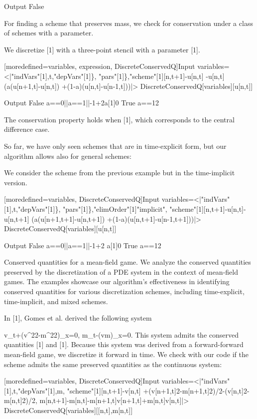 \documentclass{article}
\begin{document}
{		{Output}
  False

	

For finding a scheme that preserves mass, we check for conservation under a class of schemes with a parameter.

	We discretize [1] with a three-point stencil with a parameter [1].
	
	
		[moredefined={variables, expression, DiscreteConservedQ}]{Input}
  variables=<|"indVars"[1],t,"depVars"[1]\},
  "pars"[1]\},"scheme"[1][n,t+1]-u[n,t]
  -u[n,t](a(u[n+1,t]-u[n,t])
  +(1-a)(u[n,t]-u[n-1,t]))|>
  DiscreteConservedQ[variables][u[n,t]]
  

		{Output}
  False		a==0||a==1||-1+2a[1]0
  True		a=={1}{2}
  

	
The conservation property holds when [1], which corresponds to the central difference case.

So far, we have only seen schemes that are in time-explicit form, but our algorithm allows also for general schemes:

	We consider the scheme from the previous example but in the time-implicit version.
	
	
		[moredefined={variables, DiscreteConservedQ}]{Input}
  variables=<|"indVars"[1],t,"depVars"[1]\},
  "pars"[1]\},"elimOrder"[1]"implicit",
  "scheme"[1][n,t+1]-u[n,t]-u[n,t+1]
  (a(u[n+1,t+1]-u[n,t+1])
  +(1-a)(u[n,t+1]-u[n-1,t+1]))|>
  DiscreteConservedQ[variables][u[n,t]]
  

		{Output}
  False		a==0||a==1||-1+2 a[1]0
  True		a=={1}{2}


	


{Conserved quantities for a mean-field game.}
We analyze the conserved quantities preserved by the discretization of a PDE system in the context of mean-field games.
The examples showcase our algorithm's effectiveness in identifying conserved quantities for various discretization schemes, including time-explicit, time-implicit, and mixed schemes.

	In [1], Gomes et al. derived the following system
	
		v_t+({v^2}{2}-{m^2}{2})_x=0,
		m_t-(vm)_x=0.
	This system admits the conserved quantities [1] and [1].
	Because this system was derived from a forward-forward mean-field game, we discretize it forward in time. We check with our code if the scheme admits the same preserved quantities as the continuous system:
	
	
		[moredefined={variables, DiscreteConservedQ}]{Input}
  variables=<|"indVars"[1],t,"depVars"[1],m,
  "scheme"[1][n,t+1]-v[n,t]
  +({v[n+1,t]}{2}-{m[n+1,t]}{2})/2-({v[n,t]}{2}-{m[n,t]}{2})/2,
  m[n,t+1]-m[n,t]-m[n+1,t]v[n+1,t]+m[n,t]v[n,t]|>
  DiscreteConservedQ[variables][[n,t],m[n,t]]
  

}
\end{document}
